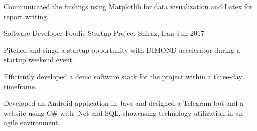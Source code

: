 \begin{cventries}
{\begin{cvitems}
      \item{Communicated the findings using Matplotlib for data visualization and Latex for report writing.}
    \end{cvitems}
  }%
  \cventry
    {Software Developer} %
    {Foodic Startup Project} %
    {Shiraz, Iran} %
    {Jun 2017} %
    {
      \begin{cvitems} %
        \item{Pitched and singd a startup opportunity with DIMOND accelerator during a startup weekend event.}
        \item{Efficiently developed a demo software stack for the project within a three-day timeframe.}
        \item{Developed an Android application in Java and designed a Telegram bot and a website using C\# with .Net and SQL, showcasing technology utilization in an agile environment.}
      \end{cvitems}
    }%
\end{cventries}
